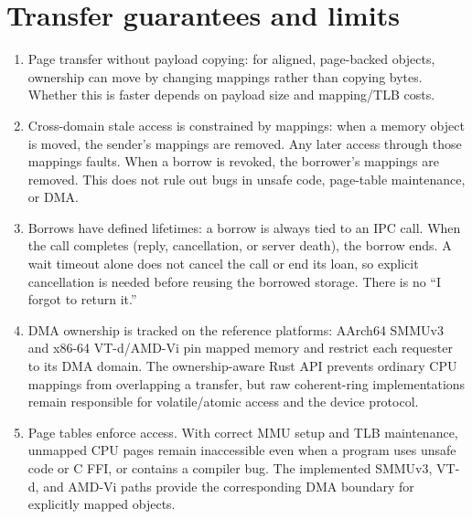 \section{Transfer guarantees and limits}

\begin{enumerate}
    \item Page transfer without payload copying: for aligned,
        page-backed objects, ownership can move by changing mappings rather than
        copying bytes. Whether this is faster depends on payload size and
        mapping/TLB costs.

    \item Cross-domain stale access is constrained by mappings:
        when a memory object is moved, the sender's mappings are removed. Any
        later access through those mappings faults. When a borrow is revoked,
        the borrower's mappings are removed. This does not rule out bugs in
        unsafe code, page-table maintenance, or DMA.

    \item Borrows have defined lifetimes: a borrow is always tied to an
        IPC call. When the call completes (reply, cancellation, or server
        death), the borrow ends. A wait timeout alone does not cancel the call
        or end its loan, so explicit cancellation is needed before reusing the
        borrowed storage. There is no ``I forgot to return it.''

    \item DMA ownership is tracked on the reference platforms: AArch64
        SMMUv3 and x86-64 VT-d/AMD-Vi pin mapped memory and restrict each
        requester to its DMA domain. The ownership-aware Rust API prevents
        ordinary CPU mappings from overlapping a transfer, but raw coherent-ring
        implementations remain responsible for volatile/atomic access and the
        device protocol.

    \item Page tables enforce access. With correct MMU setup and TLB maintenance,
        unmapped CPU pages remain inaccessible even when a program uses unsafe
        code or C FFI, or contains a compiler bug. The implemented SMMUv3, VT-d,
        and AMD-Vi paths provide the corresponding DMA boundary for explicitly
        mapped objects.
\end{enumerate}

\endinput
